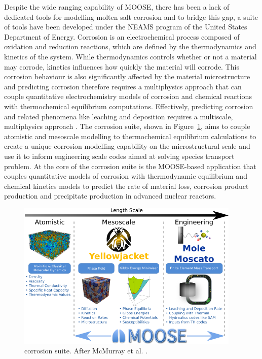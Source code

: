 	Despite the wide ranging capability of MOOSE, there has been a lack of dedicated tools for modelling molten salt corrosion and to bridge this gap, a suite of tools have been developed under the NEAMS program of the United States Department of Energy. Corrosion is an electrochemical process composed of oxidation and reduction reactions, which are defined by the thermodynamics and kinetics of the system. While thermodynamics controls whether or not a material may corrode, kinetics influences how quickly the material will corrode. This corrosion behaviour is also significantly affected by the material microstructure and predicting corrosion therefore requires a multiphysics approach that can couple quantitative electrochemistry models of corrosion and chemical reactions with thermochemical equilibrium computations. Effectively, predicting corrosion and related phenomena like leaching and deposition requires a multiscale, multiphysics approach \cite{Mcmurray:2018aa}. The corrosion suite, shown in Figure~\ref{fig:yj_suite}, aims to couple atomistic and mesoscale modelling to thermochemical equilibrium calculations to create a unique corrosion modelling capability on the microstructural scale and use it to inform engineering scale codes aimed at solving species transport problem. At the core of the corrosion suite is the MOOSE-based application {\YJ} that couples quantitative models of corrosion with thermodynamic equilibrium and chemical kinetics models to predict the rate of material loss, corrosion product production and precipitate production in advanced nuclear reactors. 
	\begin{figure}[htb]
		\centering
		\includegraphics[width=0.95\textwidth]{figures/chapter-1/Yellowjacket_Suite.png}
		\caption[{\YJ} corrosion suite.]{{\YJ} corrosion suite. After McMurray et al. \cite{McMurray:2020aa}.}
		\label{fig:yj_suite}
	\end{figure}
 
